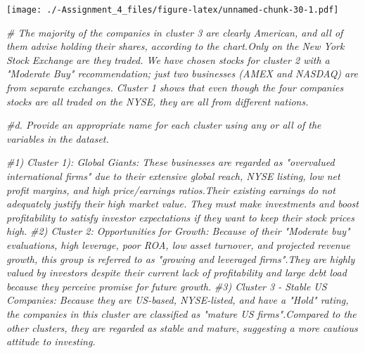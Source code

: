 \documentclass[
]{article}
\newenvironment{Shaded}{\begin{snugshade}}{\end{snugshade}}
\newcommand{\CommentTok}[1]{\textcolor[rgb]{0.56,0.35,0.01}{\textit{#1}}}
\begin{document}
\texttt{[image: ./-Assignment\_4\_files/figure-latex/unnamed-chunk-30-1.pdf]}

\begin{Shaded}
\begin{Highlighting}[]
\CommentTok{\# The majority of the companies in cluster 3 are clearly American, and all of them advise holding their shares, according to the chart.Only on the New York Stock Exchange are they traded. We have chosen stocks for cluster 2 with a "Moderate Buy" recommendation; just two businesses (AMEX and NASDAQ) are from separate exchanges. Cluster 1 shows that even though the four companies\textquotesingle{} stocks are all traded on the NYSE, they are all from different nations.}
\end{Highlighting}
\end{Shaded}

\begin{Shaded}
\begin{Highlighting}[]
\CommentTok{\#d. Provide an appropriate name for each cluster using any or all of the variables in the dataset.}

\CommentTok{\#1) Cluster 1): Global Giants: These businesses are regarded as "overvalued international firms" due to their extensive global reach, NYSE listing, low net profit margins, and high price/earnings ratios.Their existing earnings do not adequately justify their high market value. They must make investments and boost profitability to satisfy investor expectations if they want to keep their stock prices high.}
\CommentTok{\#2) Cluster 2: Opportunities for Growth: Because of their "Moderate buy" evaluations, high leverage, poor ROA, low asset turnover, and projected revenue growth, this group is referred to as "growing and leveraged firms".They are highly valued by investors despite their current lack of profitability and large debt load because they perceive promise for future growth.}
\CommentTok{\#3) Cluster 3 {-} Stable US Companies: Because they are US{-}based, NYSE{-}listed, and have a "Hold" rating, the companies in this cluster are classified as "mature US firms".Compared to the other clusters, they are regarded as stable and mature, suggesting a more cautious attitude to investing.}
\end{Highlighting}
\end{Shaded}
\end{document}
